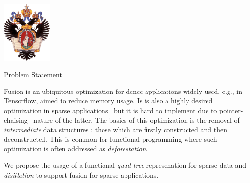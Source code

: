 \documentclass[a0paper,portrait]{baposter}
\begin{document}
\begin{poster}
{  \hspace{0.5cm}  
  \includegraphics[width=2.5cm]{SPbGU_Logo.png}
}
\begin{posterbox}[name=CFPQ, column=0, row=0, span=6]{Problem Statement}

  Fusion is an ubiquitous optimization for dence applications widely used, e.g., in Tensorflow, aimed to reduce memory usage.
  Is is also a highly desired optimization in sparse applications~\cite{yang2020graphblast} but it is hard to implement due to pointer-chaising~\cite{Futhark} nature of the latter.
  The basics of this optimization is the removal of \emph{intermediate} data structures : those which are firstly constructed and then deconstructed. This is common for functional programming where such optimization is often addressed as \emph{deforestation}.\\
  \par
  We propose the usage of a functional \emph{quad-tree} represenation for sparse data and \emph{disillation} to support fusion for sparse applications.
  
\end{posterbox}

\end{poster}
\end{document}
